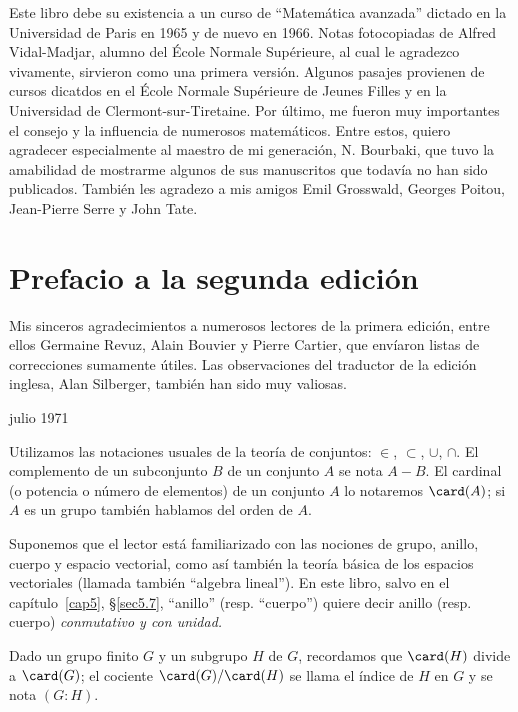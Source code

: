 \documentclass[oneside,bibtotoc,leqno,spanish]{amsbook}
\numberwithin{equation}{section}
\theoremstyle{defi}
\theoremstyle{note}
\theoremstyle{rem}
\numberwithin{theorem}{section}
\numberwithin{proposition}{section}
\numberwithin{definition}{section}
\numberwithin{lemma}{section}
\numberwithin{corollary}{section}
\numberwithin{example}{section}
\numberwithin{footnote}{section}%
\begin{document}
Este libro debe su existencia a un curso de ``Matem\'atica avanzada''
dictado en la Universidad de Paris en 1965 y de nuevo en 1966.
Notas fotocopiadas de {Alfred Vidal-Madjar,} alumno del \'Ecole
Normale Sup\'erieure, al cual le agradezco vivamente, sirvieron
como una primera versi\'on. Algunos pasajes provienen de cursos dicatdos
en el \'Ecole Normale Sup\'erieure de Jeunes Filles y en la Universidad
de Clermont-sur-Tiretaine. Por \'ultimo, me fueron muy importantes el consejo
y la influencia de numerosos matem\'aticos. Entre estos, quiero agradecer
especialmente al maestro de mi generaci\'on, {N. Bourbaki,} que tuvo la
amabilidad de mostrarme algunos de sus manuscritos que todav\'ia no han sido
publicados. Tambi\'en les agradezo a mis amigos {Emil Grosswald,} {Georges
Poitou,} {Jean-Pierre Serre} y {John Tate.}

\section*{Prefacio a la segunda edici\'on}

Mis sinceros agradecimientos a numerosos lectores de la primera
edici\'on, entre ellos Germaine Revuz, Alain Bouvier y Pierre Cartier,
que env\'iaron listas de correcciones sumamente \'utiles. Las observaciones
del traductor de la edici\'on inglesa, Alan Silberger, tambi\'en han sido
muy valiosas.

\begin{flushright}
julio 1971
\end{flushright}


Utilizamos las notaciones usuales de la teor\'ia de conjuntos:
$\in$, $\subset$, $\cup$, $\cap$.
El complemento de un subconjunto $B$ de un conjunto $A$ se nota $A - B$.
El cardinal (o potencia o n\'umero de elementos) de un conjunto $A$ lo notaremos
$\card(A)$; si $A$ es un grupo tambi\'en hablamos del orden de $A$.

Suponemos que el lector est\'a familiarizado
con las nociones de grupo, anillo, cuerpo y espacio vectorial,
como as\'i tambi\'en la teor\'ia b\'asica de los espacios vectoriales
(llamada tambi\'en ``algebra lineal''). En este libro, salvo en el cap\'itulo~\ref{cap5},
\S\ref{sec5.7}, ``anillo'' (resp. ``cuerpo'') quiere decir anillo (resp. cuerpo)
\emph{conmutativo y con unidad.}

Dado un grupo finito $G$ y un subgrupo $H$ de $G$, recordamos que $\card(H)$ divide
a $\card(G)$; el cociente $\card(G)/\card(H)$ se llama el \'indice de $H$ en $G$ y
se nota $(G:H)$.
\end{document}
